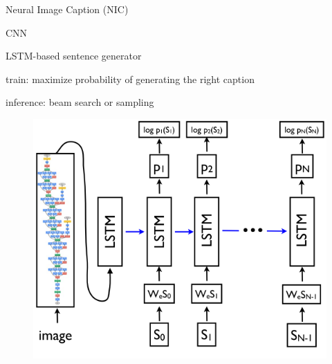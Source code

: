 \documentclass[16pt]{beamer}
\newenvironment{wideitemize}{\itemize\addtolength{\itemsep}{10pt}}{\enditemize}
\begin{document}
\begin{frame}{Neural Image Caption (NIC) \cite{Google}}
\begin{wideitemize}
\item CNN
\item LSTM-based sentence generator
\item train: maximize probability of generating the right caption
\item inference: beam search or sampling
\begin{figure}[tb]
           \centering
           \includegraphics[scale=0.5]{vinyals.PNG}
\end{figure} %

\end{wideitemize}
\end{frame}
\end{document}
